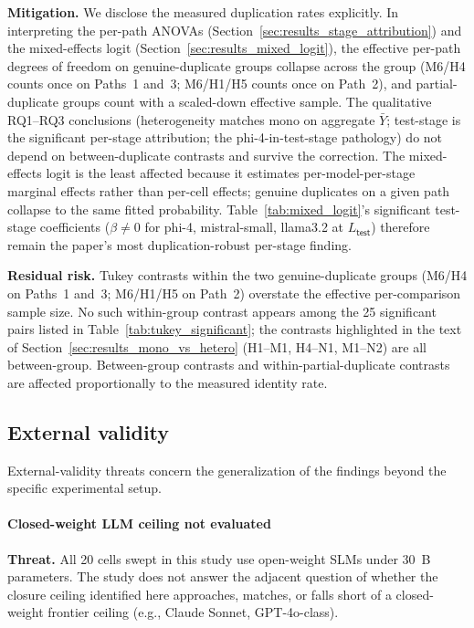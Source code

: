 \textbf{Mitigation.} We disclose the measured duplication rates explicitly. In interpreting the per-path ANOVAs (Section~\ref{sec:results_stage_attribution}) and the mixed-effects logit (Section~\ref{sec:results_mixed_logit}), the effective per-path degrees of freedom on genuine-duplicate groups collapse across the group (M6/H4 counts once on Paths~1 and~3; M6/H1/H5 counts once on Path~2), and partial-duplicate groups count with a scaled-down effective sample. The qualitative RQ1--RQ3 conclusions (heterogeneity matches mono on aggregate $\bar{Y}$; test-stage is the significant per-stage attribution; the phi-4-in-test-stage pathology) do not depend on between-duplicate contrasts and survive the correction. The mixed-effects logit is the least affected because it estimates per-model-per-stage marginal effects rather than per-cell effects; genuine duplicates on a given path collapse to the same fitted probability. Table~\ref{tab:mixed_logit}'s significant test-stage coefficients ($\beta \neq 0$ for phi-4, mistral-small, llama3.2 at $L_{\textsf{test}}$) therefore remain the paper's most duplication-robust per-stage finding.

\textbf{Residual risk.} Tukey contrasts within the two genuine-duplicate groups (M6/H4 on Paths~1 and~3; M6/H1/H5 on Path~2) overstate the effective per-comparison sample size. No such within-group contrast appears among the 25 significant pairs listed in Table~\ref{tab:tukey_significant}; the contrasts highlighted in the text of Section~\ref{sec:results_mono_vs_hetero} (H1--M1, H4--N1, M1--N2) are all between-group. Between-group contrasts and within-partial-duplicate contrasts are affected proportionally to the measured identity rate.

\subsection{External validity}
\label{sec:limitations_external}

External-validity threats concern the generalization of the findings beyond the specific experimental setup.

\paragraph{Closed-weight LLM ceiling not evaluated}

\textbf{Threat.} All 20 cells swept in this study use open-weight SLMs under 30~B parameters. The study does not answer the adjacent question of whether the closure ceiling identified here approaches, matches, or falls short of a closed-weight frontier ceiling (e.g., Claude Sonnet, GPT-4o-class).


